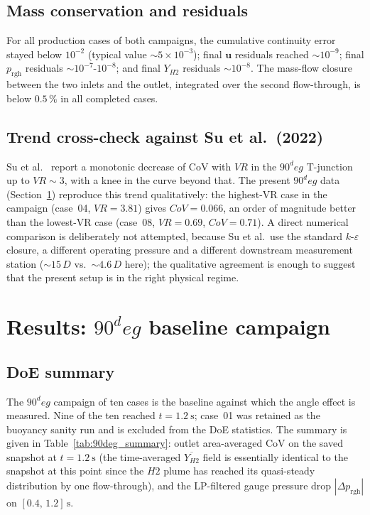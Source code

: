 \documentclass[11pt,a4paper]{article}
\def\Hi{H2}%
\def\VR{VR}%
\def\CoV{CoV}%
\def\circ{ deg}%
\newcommand{\Hi}{\ensuremath{\mathrm{H_2}}}
\newcommand{\VR}{\ensuremath{\mathrm{VR}}}
\newcommand{\CoV}{\ensuremath{\mathrm{CoV}}}
\begin{document}
\subsection{Mass conservation and residuals}
\label{sec:val_mass}
For all production cases of both campaigns, the cumulative
continuity error stayed below \(10^{-2}\) (typical value
\(\sim 5\times 10^{-3}\)); final \(\mathbf{u}\) residuals reached
\(\sim 10^{-9}\); final \(p_{\mathrm{rgh}}\) residuals
\(\sim 10^{-7}\)-\(10^{-8}\); and final \(Y_{\Hi}\) residuals
\(\sim 10^{-8}\). The mass-flow closure between the two inlets and
the outlet, integrated over the second flow-through, is below
\(0.5\,\%\) in all completed cases.

\subsection{Trend cross-check against Su et al.\ (2022)}
\label{sec:val_su}
Su et al.~\citep{su2022prediction} report a monotonic decrease of
\CoV{} with \(\VR\) in the \(90^\circ\) T-junction up to
\(\VR\sim 3\), with a knee in the curve beyond that. The present
\(90^\circ\) data (Section~\ref{sec:results_90}) reproduce this
trend qualitatively: the highest-\VR{} case in the campaign
(case~04, \(\VR=3.81\)) gives \(\CoV=0.066\), an order of
magnitude better than the lowest-\VR{} case (case~08,
\(\VR=0.69\), \(\CoV=0.71\)). A direct numerical comparison is
deliberately not attempted, because Su et al.~use the standard
\(k\)-\(\varepsilon\) closure, a different operating pressure and
a different downstream measurement station (\(\sim 15\,D\) vs.\
\(\sim 4.6\,D\) here); the qualitative agreement is enough to
suggest that the present setup is in the right physical regime.

\section{\texorpdfstring{Results: $90^\circ$ baseline campaign}{Results: 90 deg baseline campaign}}
\label{sec:results_90}

\subsection{DoE summary}
The \(90^\circ\) campaign of ten cases is the baseline against
which the angle effect is measured. Nine of the ten reached
\(t = \SI{1.2}{\second}\); case~01 was retained as the buoyancy
sanity run and is excluded from the DoE statistics. The summary is
given in Table~\ref{tab:90deg_summary}: outlet area-averaged \CoV{}
on the saved snapshot at \(t=\SI{1.2}{\second}\) (the time-averaged
\(\overline{Y_{\Hi}}\) field is essentially identical to the
snapshot at this point since the \(\Hi\) plume has reached its
quasi-steady distribution by one flow-through), and the LP-filtered
gauge pressure drop \(|\Delta p_{\mathrm{rgh}}|\) on
\([0.4,\,1.2]\,\si{\second}\).
\end{document}

